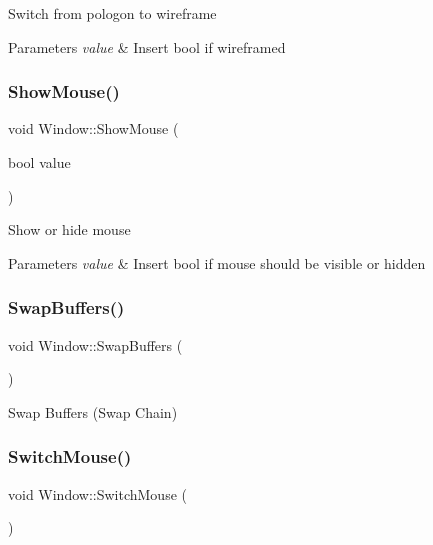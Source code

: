 Switch from pologon to wireframe 
\begin{DoxyParams}{Parameters}
{\em value} & Insert bool if wireframed \\
\hline
\end{DoxyParams}
\mbox{\label{class_window_a512773cac894acf5fcb747050f23ca57}} 
\subsubsection{\texorpdfstring{ShowMouse()}{ShowMouse()}}
{\footnotesize\ttfamily void Window\+::\+Show\+Mouse (\begin{DoxyParamCaption}\item[{bool}]{value }\end{DoxyParamCaption})}

Show or hide mouse 
\begin{DoxyParams}{Parameters}
{\em value} & Insert bool if mouse should be visible or hidden \\
\hline
\end{DoxyParams}
\mbox{\label{class_window_abe1b83eda6980f2b9964aab08b5310ed}} 
\subsubsection{\texorpdfstring{SwapBuffers()}{SwapBuffers()}}
{\footnotesize\ttfamily void Window\+::\+Swap\+Buffers (\begin{DoxyParamCaption}{ }\end{DoxyParamCaption})}

Swap Buffers (Swap Chain) \mbox{\label{class_window_a89151a47b0118a6f3c5d5f7939e080ed}} 
\subsubsection{\texorpdfstring{SwitchMouse()}{SwitchMouse()}}
{\footnotesize\ttfamily void Window\+::\+Switch\+Mouse (\begin{DoxyParamCaption}{ }\end{DoxyParamCaption})}

